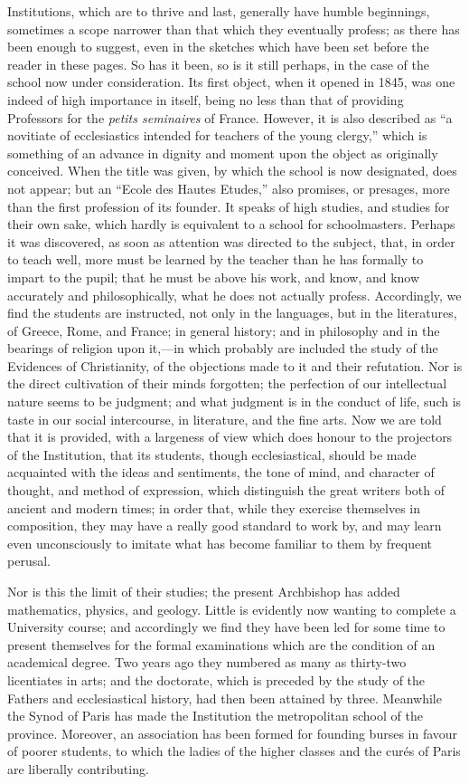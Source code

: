 Institutions, which are to
thrive and last, generally have humble beginnings, sometimes a scope
narrower than that which they eventually profess; as there has been
enough to suggest, even in the sketches which have been set before the
reader in these pages. So has it been, so is it still perhaps, in the
case of the school now under consideration. Its first object, when it
opened in 1845, was one indeed of high importance in itself, being
no less than that of providing Professors for the \emph{petits
seminaires} of France. However, it is also described as ``a
novitiate of ecclesiastics intended for teachers of the young
clergy,'' which is something of an advance in dignity and moment upon
the object as originally conceived. When the title was given, by which
the school is now designated, does not appear; but an ``Ecole des
Hautes Etudes,'' also promises, or presages, more than the first
profession of its founder. It speaks of high studies, and studies for
their own sake, which hardly is equivalent to a school for
schoolmasters. Perhaps it was discovered, as soon as attention was
directed to the subject, that, in order to teach well, more must be
learned by the teacher than he has formally to impart to the pupil;
that he must be above his work, and know, and know accurately and
philosophically, what he does not actually profess. Accordingly, we
find the students are instructed, not only in the languages, but in
the literatures, of Greece, Rome, and France; in general history; and
in philosophy and in the bearings of religion upon it,—in which
probably are included the study of the Evidences of Christianity, of
the objections made to it and their refutation. Nor is the direct
cultivation of their minds forgotten; the perfection of our
intellectual nature seems to be judgment; and what judgment is in the
conduct of life, such is taste in our social intercourse, in
literature, and the fine arts. Now we are told that it is provided,
with a largeness of view which does honour to the projectors of the
Institution, that its students, though ecclesiastical, should be made
acquainted with the ideas and sentiments, the tone of mind, and
character of thought, and method of expression, which distinguish the
great writers both of ancient and modern times; in order that, while
they exercise themselves in composition, they may have a really
good standard to work by, and may learn even unconsciously to imitate
what has become familiar to them by frequent perusal.

Nor is this the limit of their
studies; the present Archbishop has added mathematics, physics, and
geology. Little is evidently now wanting to complete a University
course; and accordingly we find they have been led for some time to
present themselves for the formal examinations which are the condition
of an academical degree. Two years ago they numbered as many as
thirty-two licentiates in arts; and the doctorate, which is preceded
by the study of the Fathers and ecclesiastical history, had then been
attained by three. Meanwhile the Synod of Paris has made the
Institution the metropolitan school of the province. Moreover, an
association has been formed for founding burses in favour of poorer
students, to which the ladies of the higher classes and the curés of
Paris are liberally contributing.

